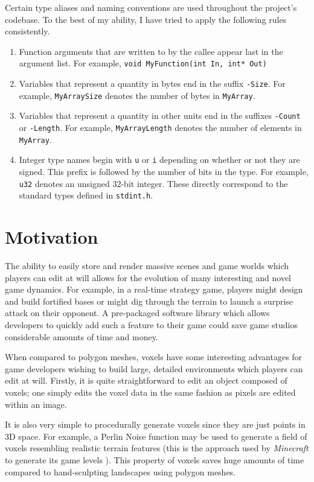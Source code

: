 Certain type aliases and naming conventions are used throughout the project's codebase. To the best of my ability, I have tried to apply the following rules consistently.
\begin{enumerate}
    \item Function arguments that are written to by the callee appear last in the  argument list. For example, \texttt{void MyFunction(int In, int* Out)}
    
    \item Variables that represent a quantity in bytes end in the suffix \texttt{-Size}. For example, \texttt{MyArraySize} denotes the number of bytes in \texttt{MyArray}.
    
    \item Variables that represent a quantity in other units end in the suffixes \texttt{-Count} or \texttt{-Length}. For example, \texttt{MyArrayLength} denotes the number of elements in \texttt{MyArray}.
    
    \item Integer type names begin with \texttt{u} or \texttt{i} depending on whether or not they are signed. This prefix is followed by the number of bits in the type. For example, \texttt{u32} denotes an unsigned 32-bit integer. These directly correspond to the standard types defined in \texttt{stdint.h}.
\end{enumerate}

\section{Motivation}
The ability to easily store and render massive scenes and game worlds which players can edit at will allows for the evolution of many interesting and novel game dynamics. For example, in a real-time strategy game, players might design and build fortified bases or might dig through the terrain to launch a surprise attack on their opponent. A pre-packaged software library which allows developers to quickly add such a feature to their game could save game studios considerable amounts of time and money.

When compared to polygon meshes, voxels have some interesting advantages for game developers wishing to build large, detailed environments which players can edit at will. Firstly, it is quite straightforward to edit an object composed of voxels; one simply edits the voxel data in the same fashion as pixels are edited within an image.

It is also very simple to procedurally generate voxels since they are just points in 3D space. For example, a Perlin Noise function may be used to generate a field of voxels resembling realistic terrain features (this is the approach used by \textit{Minecraft} to generate its game levels \autocite{fingas2015minecraft}). This property of voxels saves huge amounts of time compared to hand-sculpting landscapes using polygon meshes.

